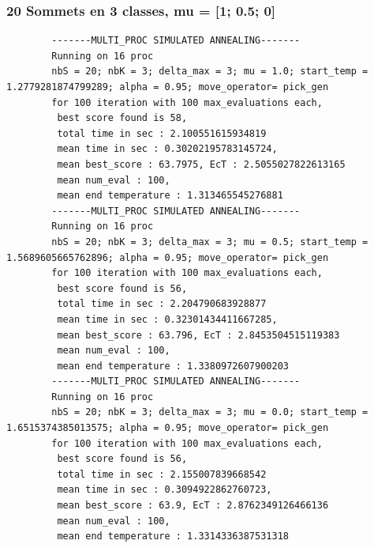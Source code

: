 \documentclass[a4paper]{article}
\begin{document}
		\subsubsection{20 Sommets en 3 classes, mu = [1; 0.5; 0]}
		\begin{verbatim}
		-------MULTI_PROC SIMULATED ANNEALING-------
		Running on 16 proc
		nbS = 20; nbK = 3; delta_max = 3; mu = 1.0; start_temp = 1.2779281874799289; alpha = 0.95; move_operator= pick_gen
		for 100 iteration with 100 max_evaluations each, 
		 best score found is 58,
		 total time in sec : 2.100551615934819
		 mean time in sec : 0.30202195783145724,
		 mean best_score : 63.7975, EcT : 2.5055027822613165
		 mean num_eval : 100,
		 mean end temperature : 1.313465545276881
		-------MULTI_PROC SIMULATED ANNEALING-------
		Running on 16 proc
		nbS = 20; nbK = 3; delta_max = 3; mu = 0.5; start_temp = 1.5689605665762896; alpha = 0.95; move_operator= pick_gen
		for 100 iteration with 100 max_evaluations each, 
		 best score found is 56,
		 total time in sec : 2.204790683928877
		 mean time in sec : 0.32301434411667285,
		 mean best_score : 63.796, EcT : 2.8453504515119383
		 mean num_eval : 100,
		 mean end temperature : 1.3380972607900203
		-------MULTI_PROC SIMULATED ANNEALING-------
		Running on 16 proc
		nbS = 20; nbK = 3; delta_max = 3; mu = 0.0; start_temp = 1.6515374385013575; alpha = 0.95; move_operator= pick_gen
		for 100 iteration with 100 max_evaluations each, 
		 best score found is 56,
		 total time in sec : 2.155007839668542
		 mean time in sec : 0.3094922862760723,
		 mean best_score : 63.9, EcT : 2.8762349126466136
		 mean num_eval : 100,
		 mean end temperature : 1.3314336387531318
		\end{verbatim}
\end{document}
